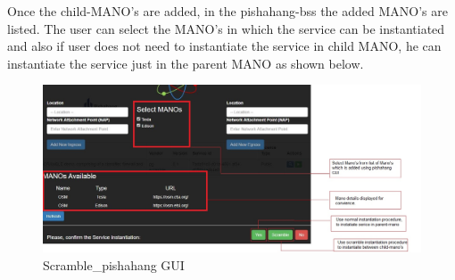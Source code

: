 Once the child-MANO's are added, in the pishahang-bss the added MANO's are listed. The user can select the MANO's in which the service can be instantiated and also if user does not need to instantiate the service in child MANO, he can instantiate the service just in the parent MANO as shown below.
\begin{figure}[H]
	\centering
	\includegraphics[width=1\linewidth]{"figures/son-bss"}
	\caption{Scramble\_pishahang GUI}
	\label{fig:sequence-diagram-scramble}
\end{figure}
  